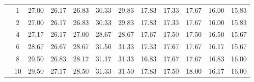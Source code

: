 \begin{table}[H]
\begin{tabular}{|c|c|c c c c c|c c c c c|}
\multicolumn{1}{|c|}{ \multirow{6}{*}{\rotatebox[origin=c]{90}{\textbf{K-vizinhos}}} }
&1	&27.00	&26.17	&26.83	&30.33	&29.83	&17.83	&17.33	&17.67&	16.00	&15.83	\\\cline{2-12}
&2	&27.00	&26.17	&26.83	&30.33	&29.83	&17.83	&17.33	&17.67&	16.00	&15.83	\\\cline{2-12}
&4	&27.17	&26.17	&27.00	&28.67	&28.67	&17.67	&17.50	&17.50&	16.50	&15.67	\\\cline{2-12}
&6	&28.67	&26.67	&28.67	&31.50	&31.33	&17.33	&17.67	&17.67&	16.17	&15.67	\\\cline{2-12}
&8	&29.50	&26.83	&28.17	&31.17	&31.33	&16.83	&17.67	&17.67&	16.83	&16.00	\\\cline{2-12}
&10	&29.50	&27.17	&28.50	&31.33	&31.50	&17.83	&17.50	&18.00&	16.17	&16.00	


\\\midrule
	\end{tabular}
\end{table}



